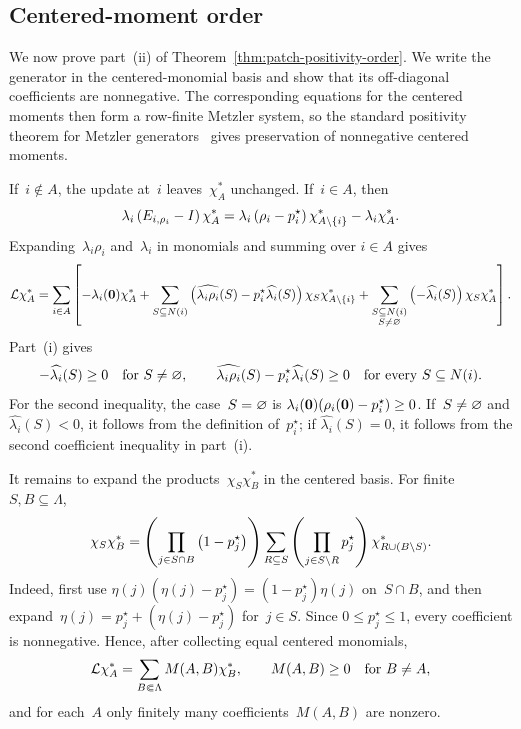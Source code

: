\subsection{Centered-moment order}
\label{sec:moment-order}
\label{subsec:moment-monotonicity}

We now prove part~\textup{(ii)} of Theorem~\ref{thm:patch-positivity-order}.
We write the generator in the centered-monomial basis and show that its
off-diagonal coefficients are nonnegative. The corresponding equations for the
centered moments then form a row-finite Metzler system, so the standard
positivity theorem for Metzler generators~\cite{ArendtEtAl1986} gives
preservation of nonnegative centered moments.

If~$i\notin A$, the update at~$i$ leaves~$\chi_A^*$ unchanged. If~$i\in A$,
then
\begin{equation*}
\lambda_i\left(E_{i,\rho_i}-I\right)\chi_A^*
=
\lambda_i\left(\rho_i-p_i^\star\right)\chi_{A\setminus\left\{i\right\}}^*
-
\lambda_i\chi_A^*.
\end{equation*}
Expanding~$\lambda_i\rho_i$ and~$\lambda_i$ in monomials and summing over
$i\in A$ gives
\begin{equation*}
\mathcal{L}\chi_A^*
=\sum_{i\in A}\left[
-\lambda_i(\mathbf{0})\chi_A^*
+
\sum_{S\subseteq N(i)}
\left(
\widehat{\lambda_i\rho_i}(S)
-p_i^\star\widehat{\lambda_i}(S)
\right)
\chi_S\chi_{A\setminus\left\{i\right\}}^*
+
\sum_{\substack{S\subseteq N(i)\\S\neq\varnothing}}
\left(-\widehat{\lambda_i}(S)\right)
\chi_S\chi_A^*
\right].
\end{equation*}
Part~\textup{(i)} gives
\begin{equation*}
-\widehat{\lambda_i}(S)\geq0
\quad\text{for }S\neq\varnothing,
\qquad
\widehat{\lambda_i\rho_i}(S)
-p_i^\star\widehat{\lambda_i}(S)
\geq0
\quad\text{for every }S\subseteq N(i).
\end{equation*}
For the second inequality, the case~$S=\varnothing$ is
$\lambda_i(\mathbf{0})(\rho_i(\mathbf{0})-p_i^\star)\geq0$. If~$S\neq\varnothing$ and
$\widehat{\lambda_i}(S)<0$, it follows from the definition of~$p_i^\star$; if
$\widehat{\lambda_i}(S)=0$, it follows from the second coefficient inequality
in part~\textup{(i)}.

It remains to expand the products~$\chi_S\chi_B^*$ in the centered basis. For
finite~$S,B\subseteq\Lambda$,
\begin{equation*}
\chi_S\chi_B^*
=
\left(\prod_{j\in S\cap B}\left(1-p_j^\star\right)\right)
\sum_{R\subseteq S}
\left(\prod_{j\in S\setminus R}p_j^\star\right)
\chi_{R\cup(B\setminus S)}^*.
\end{equation*}
Indeed, first use
$\eta(j)(\eta(j)-p_j^\star)=(1-p_j^\star)\eta(j)$ on~$S\cap B$, and then
expand~$\eta(j)=p_j^\star+(\eta(j)-p_j^\star)$ for~$j\in S$. Since
$0\leq p_j^\star\leq1$, every coefficient is nonnegative. Hence, after
collecting equal centered monomials,
\begin{equation*}
\mathcal{L}\chi_A^*
=
\sum_{B\Subset\Lambda}M(A,B)\chi_B^*,
\qquad
M(A,B)\geq0\quad\text{for }B\neq A,
\end{equation*}
and for each~$A$ only finitely many coefficients~$M(A,B)$ are nonzero.

